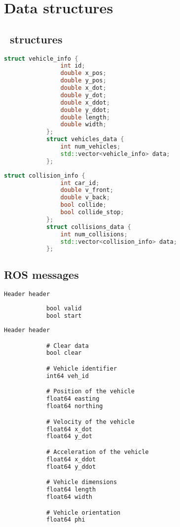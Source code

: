 \chapter{Data structures}
\label{app:code}

    \section{\CC\ structures}
        \begin{lstlisting}[language=C++, caption={Vehicle data structure}, label={lst:vehicle_data}]
            struct vehicle_info {
                int id;
                double x_pos;
                double y_pos;
                double x_dot;
                double y_dot;
                double x_ddot;
                double y_ddot;
                double length;
                double width;
            };
            struct vehicles_data {
                int num_vehicles;
                std::vector<vehicle_info> data;
            };
        \end{lstlisting}

        \begin{lstlisting}[language=C++, caption={Collision data structure}, label={lst:collision_data}]
            struct collision_info {
                int car_id;
                double v_front;
                double v_back;
                bool collide;
                bool collide_stop;
            };
            struct collisions_data {
                int num_collisions;
                std::vector<collision_info> data;
            };
        \end{lstlisting}

    \section{ROS messages}
        \begin{lstlisting}[language=C, caption={Start message file}, label={lst:start_msgs}]
            Header header
            
            bool valid
            bool start
        \end{lstlisting}

        \begin{lstlisting}[language=C, caption={Injector message file}, label={lst:injector_msgs}]
            Header header

            # Clear data
            bool clear

            # Vehicle identifier
            int64 veh_id

            # Position of the vehicle
            float64 easting
            float64 northing

            # Velocity of the vehicle
            float64 x_dot
            float64 y_dot

            # Acceleration of the vehicle
            float64 x_ddot
            float64 y_ddot

            # Vehicle dimensions
            float64 length
            float64 width

            # Vehicle orientation
            float64 phi
        \end{lstlisting}
